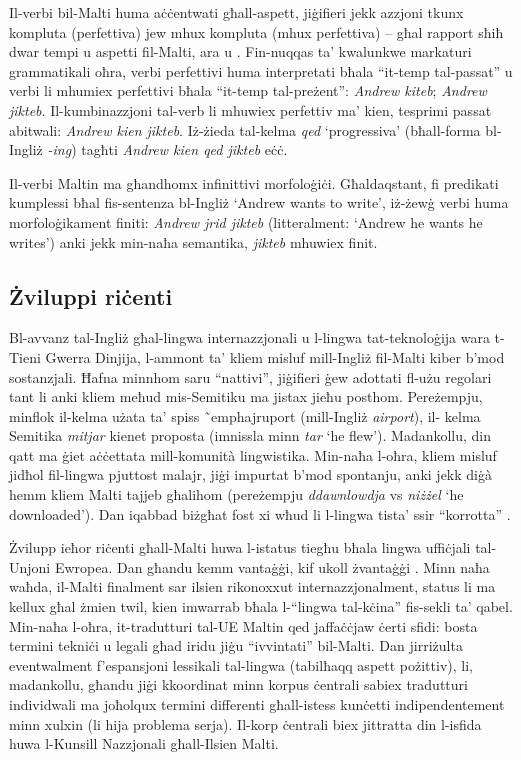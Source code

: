 \documentclass[]{../../metanetpaper}
\begin{document}
\begin{multicols}{2}

Il-verbi bil-Malti huma aċċentwati għall-aspett, jiġifieri jekk azzjoni tkunx kompluta (perfettiva) jew mhux kompluta (mhux perfettiva) -- għal rapport sħiħ dwar tempi u aspetti fil-Malti, ara \cite{Fabri:1995} u \cite{Ebert:2000}. Fin-nuqqas ta’ kwalunkwe markaturi grammatikali oħra, verbi perfettivi huma interpretati bħala ``it-temp tal-passat'' u verbi li mhumiex perfettivi bħala ``it-temp tal-preżent'': \emph{Andrew kiteb}; \emph{Andrew jikteb}. Il-kumbinazzjoni tal-verb li mhuwiex perfettiv ma’ kien, tesprimi passat abitwali: \emph{Andrew kien jikteb}. Iż-żieda tal-kelma \emph{qed} `progressiva' (bħall-forma bl-Ingliż \emph{-ing}) tagħti \emph{Andrew kien qed jikteb} eċċ.

Il-verbi Maltin ma għandhomx infinittivi morfoloġiċi. Għaldaqstant, fi predikati kumplessi bħal fis-sentenza bl-Ingliż `Andrew wants to write', iż-żewġ verbi huma morfoloġikament finiti: \emph{Andrew jrid jikteb} (litteralment: `Andrew he wants he writes') anki jekk min-naħa semantika, \emph{jikteb} mhuwiex finit.

\subsection{Żviluppi riċenti}

Bl-avvanz tal-Ingliż għal-lingwa internazzjonali u l-lingwa tat-teknoloġija wara t-Tieni Gwerra Dinjija, l-ammont ta’ kliem misluf mill-Ingliż fil-Malti kiber b’mod sostanzjali. Ħafna minnhom saru ``nattivi'', jiġifieri ġew adottati fl-użu regolari tant li anki kliem meħud mis-Semitiku ma jistax jieħu posthom. Pereżempju, minflok il-kelma użata ta’ spiss ˜emph{ajruport} (mill-Ingliż \emph{airport}), il- kelma Semitika \emph{mitjar} kienet proposta (imnissla minn \emph{tar} `he flew'). Madankollu, din qatt ma ġiet aċċettata mill-komunità lingwistika. Min-naħa l-oħra, kliem misluf jidħol fil-lingwa pjuttost malajr, jiġi impurtat b’mod spontanju, anki jekk diġà hemm kliem Malti tajjeb għalihom (pereżempju \emph{ddawnlowdja} vs \emph{niżżel} `he downloaded'). Dan iqabbad biżgħat fost xi wħud li l-lingwa tista’ ssir ``korrotta'' \cite{Fabri:2011a}.

Żvilupp ieħor riċenti għall-Malti huwa l-istatus tiegħu bħala lingwa uffiċjali tal-Unjoni Ewropea. Dan għandu kemm vantaġġi, kif ukoll żvantaġġi \cite{Fabri:2011a}. Minn naħa waħda, il-Malti finalment sar ilsien rikonoxxut internazzjonalment, status li ma kellux għal żmien twil, kien imwarrab bħala l-``lingwa tal-kċina'' fis-sekli ta’ qabel. Min-naħa l-oħra, it-tradutturi tal-UE Maltin qed jaffaċċjaw ċerti sfidi: bosta termini tekniċi u legali għad iridu jiġu ``ivvintati'' bil-Malti. Dan jirriżulta eventwalment f’espansjoni lessikali tal-lingwa (tabilħaqq aspett pożittiv), li, madankollu, għandu jiġi kkoordinat minn korpus ċentrali sabiex tradutturi individwali ma joħolqux termini differenti għall-istess kunċetti indipendentement minn xulxin (li hija problema serja). Il-korp ċentrali biex jittratta din l-isfida huwa l-Kunsill Nazzjonali għall-Ilsien Malti.


\end{multicols}
\end{document}
